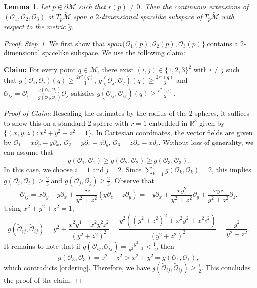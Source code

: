 \documentclass[10pt, reqno]{amsart}
\newtheorem{lemma}[theorem]{Lemma}
\theoremstyle{definition}
\theoremstyle{remark}
\numberwithin{equation}{section}
\newcommand{\rd}{\partial}
\newcommand{\0}{\emptyset}
\newcommand{\f}{\frac}
\newcommand{\pfstep}[1]{\vspace{.5em} {\it \noindent #1.}}
\begin{document}
\begin{lemma}\label{span.O}
Let $p\in \rd\mathcal M$ such that $r(p)\neq 0$. Then the continuous extensions of $(\mathcal O_1, \mathcal O_2, \mathcal O_3)$ at $T_p \widetilde{\mathcal M}$ span a $2$-dimensional spacelike subspace of $T_p \widetilde{\mathcal M}$ with respect to the metric $\tilde{g}$.
\end{lemma}
\begin{proof}
\pfstep{Step~1} We first show that $span\{\mathcal O_1(p), \mathcal O_2(p), \mathcal O_3(p)\}$ contains a $2$-dimensional spacelike subspace. We use the following claim: 

{\bf Claim:} For every point $q\in\mathcal M$, there exist $(i,j)\in \{1,2,3\}^2$ with $i\neq j$ such that $g(\mathcal O_i,\mathcal O_i)(q)\geq \f{2 r^2(q)}{3}$, $g(\mathcal O_j,\mathcal O_j)(q)\geq \f{2 r^2(q)}{3}$ and $\widetilde{\mathcal O}_{ij}=\mathcal O_i-\f{g(\mathcal O_i,\mathcal O_j)}{g(\mathcal O_j,\mathcal O_j)}\mathcal O_j$ satisfies $g(\widetilde{\mathcal O}_{ij},\widetilde{\mathcal O}_{ij})(q)\geq \f{r^2(q)}{2}$.

\emph{Proof of Claim:} Rescaling the estimates by the radius of the $2$-spheres, it suffices to show this on a standard $2$-sphere with $r=1$ embedded in $\mathbb R^3$ given by $\{(x,y,z):x^2+y^2+z^2=1\}$. In Cartesian coordinates, the vector fields are given by $\mathcal O_1=x\rd_y-y\rd_x$, $\mathcal O_2=y\rd_z-z\rd_y$, $\mathcal O_3=z\rd_x-x\rd_z$. Without loss of generality, we can assume that
\begin{equation}\label{ordering}
g(\mathcal O_1,\mathcal O_1)\geq g(\mathcal O_2,\mathcal O_2)\geq g(\mathcal O_3, \mathcal O_3).
\end{equation}
In this case, we choose $i=1$ and $j=2$. Since $\sum_{k=1}^3 g(\mathcal O_k, \mathcal O_k)=2$, this implies $g(\mathcal O_i, \mathcal O_i)\geq \f 23$ and $g(\mathcal O_j, \mathcal O_j)\geq \f 23$. Observe that
$$\widetilde{\mathcal O}_{ij}=x\rd_y-y\rd_x+\f{xz}{y^2+z^2}(y\rd_z-z\rd_y)=-y\rd_x+\f{x y^2}{y^2+z^2}\rd_y+\f{xyz}{y^2+z^2}\rd_z.$$
Using $x^2+y^2+z^2=1$,
$$g(\widetilde{\mathcal O}_{ij},\widetilde{\mathcal O}_{ij})=y^2+\f{x^2 y^4+x^2y^2z^2}{(y^2+z^2)^2}=\f{y^2 ((y^2+z^2)^2+ x^2 y^2+x^2  z^2)}{(y^2+z^2)^2}=\f{y^2 }{y^2+z^2}.$$
It remains to note that if $g(\widetilde{\mathcal O}_{ij},\widetilde{\mathcal O}_{ij})=\f{y^2 }{y^2+z^2}< \f 12$, then 
$$g(\mathcal O_3,\mathcal O_3)=x^2+z^2>x^2+y^2=g(\mathcal O_1,\mathcal O_1),$$
which contradicts \eqref{ordering}. Therefore, we have $g(\widetilde{\mathcal O}_{ij},\widetilde{\mathcal O}_{ij})\geq \f 12$. This concludes the proof of the claim.


\end{proof}
\end{document}
